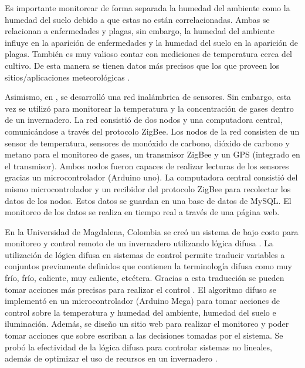 Es importante monitorear de forma separada la humedad del ambiente como la humedad del suelo debido a que estas no están correlacionadas. Ambas se relacionan a enfermedades y plagas, sin embargo, la humedad del ambiente influye en la aparición de enfermedades y la humedad del suelo en la aparición de plagas. También es muy valioso contar con mediciones de temperatura cerca del cultivo. De esta manera se tienen datos más precisos que los que proveen los sitios/aplicaciones meteorológicas \cite{olive_orchard_monitorization}.

Asimismo, en \cite{wsn_greenhouse_gases}, se desarrolló una red inalámbrica de sensores. Sin embargo, esta vez se utilizó para monitorear la temperatura y la concentración de gases dentro de un invernadero. La red consistió de dos nodos y una computadora central, comunicándose a través del protocolo ZigBee. Los nodos de la red consisten de un sensor de temperatura, sensores de monóxido de carbono, dióxido de carbono y metano para el monitoreo de gases, un transmisor ZigBee y un GPS (integrado en el transmisor). Ambos nodos fueron capaces de realizar lecturas de los sensores gracias un microcontrolador (Arduino uno). La computadora central consistió del mismo microcontrolador y un recibidor del protocolo ZigBee para recolectar los datos de los nodos. Estos datos se guardan en una base de datos de MySQL. El monitoreo de los datos se realiza en tiempo real a través de una página web.

En la Universidad de Magdalena, Colombia se creó un sistema de bajo costo para monitoreo y control remoto de un invernadero utilizando lógica difusa \cite{low_cost_fuzzy_logic_greenhouse}. La utilización de lógica difusa en sistemas de control permite traducir variables a conjuntos previamente definidos que contienen la terminología difusa como muy frío, frío, caliente, muy caliente, etcétera. Gracias a esta traducción se pueden tomar acciones más precisas para realizar el control \cite{agriculture_automation_review}. El algoritmo difuso se implementó en un microcontrolador (Arduino Mega) para tomar acciones de control sobre la temperatura y humedad del ambiente, humedad del suelo e iluminación. Además, se diseño un sitio web para realizar el monitoreo y poder tomar acciones que sobre escriban a las decisiones tomadas por el sistema. Se probó la efectividad de la lógica difusa para controlar sistemas no lineales, además de optimizar el uso de recursos en un 
invernadero \cite{low_cost_fuzzy_logic_greenhouse}.

